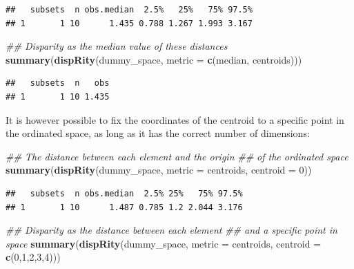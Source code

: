 \documentclass[]{book}
\newenvironment{Shaded}{\begin{snugshade}}{\end{snugshade}}
\newcommand{\CommentTok}[1]{\textcolor[rgb]{0.56,0.35,0.01}{\textit{#1}}}
\newcommand{\DataTypeTok}[1]{\textcolor[rgb]{0.13,0.29,0.53}{#1}}
\newcommand{\DecValTok}[1]{\textcolor[rgb]{0.00,0.00,0.81}{#1}}
\newcommand{\KeywordTok}[1]{\textcolor[rgb]{0.13,0.29,0.53}{\textbf{#1}}}
\newcommand{\NormalTok}[1]{#1}
\begin{document}
\begin{verbatim}
##   subsets  n obs.median  2.5%   25%   75% 97.5%
## 1       1 10      1.435 0.788 1.267 1.993 3.167
\end{verbatim}

\begin{Shaded}
\begin{Highlighting}[]
\CommentTok{## Disparity as the median value of these distances}
\KeywordTok{summary}\NormalTok{(}\KeywordTok{dispRity}\NormalTok{(dummy_space, }\DataTypeTok{metric =} \KeywordTok{c}\NormalTok{(median, centroids)))}
\end{Highlighting}
\end{Shaded}

\begin{verbatim}
##   subsets  n   obs
## 1       1 10 1.435
\end{verbatim}

It is however possible to fix the coordinates of the centroid to a specific point in the ordinated space, as long as it has the correct number of dimensions:

\begin{Shaded}
\begin{Highlighting}[]
\CommentTok{## The distance between each element and the origin}
\CommentTok{## of the ordinated space}
\KeywordTok{summary}\NormalTok{(}\KeywordTok{dispRity}\NormalTok{(dummy_space, }\DataTypeTok{metric =}\NormalTok{ centroids, }\DataTypeTok{centroid =} \DecValTok{0}\NormalTok{))}
\end{Highlighting}
\end{Shaded}

\begin{verbatim}
##   subsets  n obs.median  2.5% 25%   75% 97.5%
## 1       1 10      1.487 0.785 1.2 2.044 3.176
\end{verbatim}

\begin{Shaded}
\begin{Highlighting}[]
\CommentTok{## Disparity as the distance between each element}
\CommentTok{## and a specific point in space}
\KeywordTok{summary}\NormalTok{(}\KeywordTok{dispRity}\NormalTok{(dummy_space, }\DataTypeTok{metric =}\NormalTok{ centroids,}
                 \DataTypeTok{centroid =} \KeywordTok{c}\NormalTok{(}\DecValTok{0}\NormalTok{,}\DecValTok{1}\NormalTok{,}\DecValTok{2}\NormalTok{,}\DecValTok{3}\NormalTok{,}\DecValTok{4}\NormalTok{)))}
\end{Highlighting}
\end{Shaded}
\end{document}
